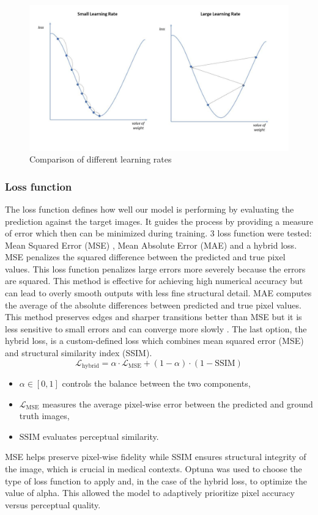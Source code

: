 \documentclass[twocolumn]{article}
\begin{document}
\begin{figure}
    \centering
    \includegraphics[width=1\linewidth]{Learn rate.jpg}
    \caption{Comparison of different learning rates}
    \label{fig:Learnrate}
\end{figure}

\subsubsection{Loss function}
The loss function defines how well our model is performing by evaluating the prediction against the target images. It guides the process by providing a measure of error which then can be minimized during training. 
3 loss function were tested: Mean Squared Error (MSE) , Mean Absolute Error (MAE) and a hybrid loss. 
MSE penalizes the squared difference between the predicted and true pixel values. This loss function penalizes large errors more severely because the errors are squared. This method is effective for achieving high numerical accuracy but can lead to overly smooth outputs with less fine structural detail.
MAE computes the average of the absolute differences between predicted and true pixel values. This method preserves edges and sharper transitions better than MSE but it is less sensitive to small errors and can converge more slowly \cite{anderson_2023_loss}.
The last option, the hybrid loss, is a custom-defined loss which combines mean squared error (MSE) and structural similarity index (SSIM).
\begin{equation}\label{eq:3}
\mathcal{L}_{\text{hybrid}} = \alpha \cdot \mathcal{L}_{\text{MSE}} + (1 - \alpha) \cdot (1 - \text{SSIM})
\end{equation}
\begin{itemize}
    \item $\alpha \in [0, 1]$ controls the balance between the two components,
    \item $\mathcal{L}_{\text{MSE}}$ measures the average pixel-wise error between the predicted and ground truth images,
    \item $\text{SSIM}$ evaluates perceptual similarity.
\end{itemize}
MSE helps preserve pixel-wise fidelity while SSIM ensures structural integrity of the image, which is crucial in medical contexts. Optuna was used to choose the type of loss function to apply and, in the case of the hybrid loss, to optimize the value of alpha. This allowed the model to adaptively prioritize pixel accuracy versus perceptual quality. 
\end{document}

